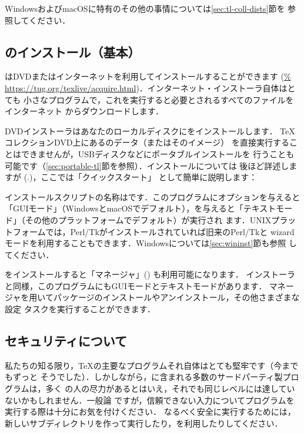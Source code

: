 \documentclass[uplatex,dvipdfmx,tombow]{jsarticle}
\begin{document}
WindowsおよびmacOSに特有のその他の事情については\ref{sec:tl-coll-dists}節を
参照してください．

\subsection{\TL のインストール（基本）}
\label{sec:basic}

\TL はDVDまたはインターネットを利用してインストールすることができます (\url{%
https://tug.org/texlive/acquire.html})．インターネット・インストーラ自体はとても
小さなプログラムで，これを実行すると必要とされるすべてのファイルをインターネット
からダウンロードします．

DVDインストーラはあなたのローカルディスクに\TL をインストールします．
\TeX コレクションDVD上にある\TL のデータ（またはそのイメージ）
を直接実行することはできませんが，USBディスクなどにポータブルインストールを
行うことも可能です（\ref{sec:portable-tl}節を参照）．インストールについては
後ほど詳述しますが (\p.\pageref{sec:install})，ここでは「クイックスタート」
として簡単に説明します：

\begin{itemize*}
\item インストールスクリプトの名称はです．このプログラムにオプションを与えると「GUIモード」（WindowsとmacOSでデフォルト），を与えると「テキストモード」（その他のプラットフォームでデフォルト）が実行され
ます．UNIXプラットフォームでは，Perl/Tkがインストールされていれば旧来のPerl/Tkと
wizardモードを利用することもできます．Windowsについては\ref{sec:wininst}節も参照
してください．

\item \TL をインストールすると「\TL マネージャ」() も利用可能になります．
インストーラと同様，このプログラムにもGUIモードとテキストモードがあります．\TL
マネージャを用いてパッケージのインストールやアンインストール，その他さまざまな設定
タスクを実行することができます．
\end{itemize*}

\subsection{セキュリティについて}
\label{sec:security}

私たちの知る限り，\TeX の主要なプログラムそれ自体はとても堅牢です（今までもずっと
そうでした）．しかしながら，\TL に含まれる多数のサードパーティ製プログラムは，多く
の人の尽力があるとはいえ，それでも同じレベルには達していないかもしれません．一般論
ですが，信頼できない入力についてプログラムを実行する際は十分にお気を付けください．
なるべく安全に実行するためには，新しいサブディレクトリを作って実行したり，を利用したりしてください．
\end{document}
